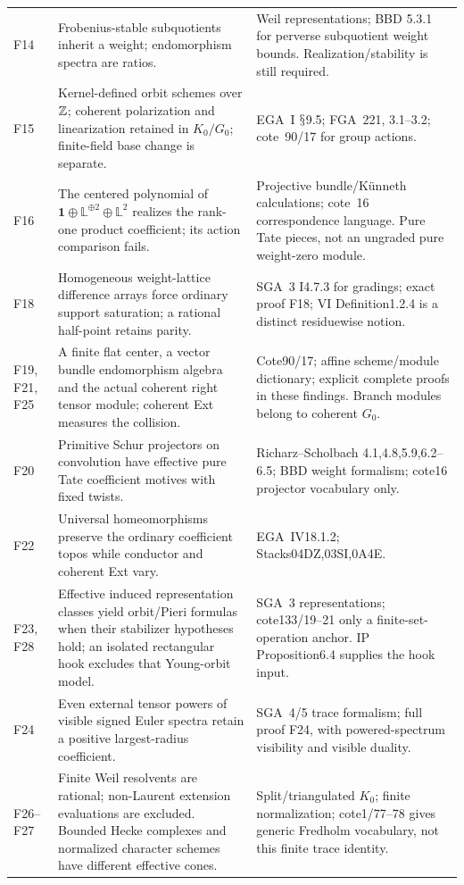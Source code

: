 \documentclass[11pt,a4paper]{article}
\renewcommand{\S}{\ensuremath{\mathsection}}
\theoremstyle{named}\newtheorem{finding}{Finding}[section]
\theoremstyle{definition}\newtheorem{definition}[finding]{Definition}
\theoremstyle{remark}\newtheorem{remark}[finding]{Remark}
\begin{document}
{\begin{longtable}{p{.12\linewidth}p{.48\linewidth}p{.32\linewidth}}
F14&Frobenius-stable subquotients inherit a weight; endomorphism spectra are ratios.&Weil representations; BBD 5.3.1 for perverse subquotient weight bounds. Realization/stability is still required.\\
F15&Kernel-defined orbit schemes over $\mathbb Z$; coherent polarization and linearization retained in $K_0/G_0$; finite-field base change is separate.&EGA~I \S9.5; FGA~221, 3.1--3.2; cote~90/17 for group actions.\\
F16&The centered polynomial of $\mathbf1\oplus\mathbb L^{\oplus2}\oplus\mathbb L^2$ realizes the rank-one product coefficient; its action comparison fails.&Projective bundle/K\"unneth calculations; cote~16 correspondence language. Pure Tate pieces, not an ungraded pure weight-zero module.\\
F18&Homogeneous weight-lattice difference arrays force ordinary support saturation; a rational half-point retains parity.&SGA~3 I4.7.3 for gradings; exact proof F18; VI Definition1.2.4 is a distinct residuewise notion.\\
F19, F21, F25&A finite flat center, a vector bundle endomorphism algebra and the actual coherent right tensor module; coherent Ext measures the collision.&Cote90/17; affine scheme/module dictionary; explicit complete proofs in these findings. Branch modules belong to coherent $G_0$.\\
F20&Primitive Schur projectors on convolution have effective pure Tate coefficient motives with fixed twists.&Richarz--Scholbach 4.1,4.8,5.9,6.2--6.5; BBD weight formalism; cote16 projector vocabulary only.\\
F22&Universal homeomorphisms preserve the ordinary coefficient topos while conductor and coherent Ext vary.&EGA~IV18.1.2; Stacks04DZ,03SI,0A4E.\\
F23, F28&Effective induced representation classes yield orbit/Pieri formulas when their stabilizer hypotheses hold; an isolated rectangular hook excludes that Young-orbit model.&SGA~3 representations; cote133/19--21 only a finite-set-operation anchor. IP Proposition6.4 supplies the hook input.\\
F24&Even external tensor powers of visible signed Euler spectra retain a positive largest-radius coefficient.&SGA~4/5 trace formalism; full proof F24, with powered-spectrum visibility and visible duality.\\
F26--F27&Finite Weil resolvents are rational; non-Laurent extension evaluations are excluded. Bounded Hecke complexes and normalized character schemes have different effective cones.&Split/triangulated $K_0$; finite normalization; cote1/77--78 gives generic Fredholm vocabulary, not this finite trace identity.\\\bottomrule
\end{longtable}}
\end{document}
